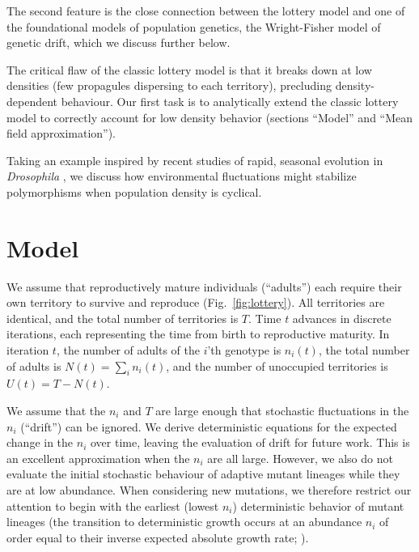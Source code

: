 \documentclass[11pt]{article}
\begin{document}
The second feature is the close connection between the lottery model and one of the foundational models of population genetics, the Wright-Fisher model of genetic drift, which we discuss further below. 

The critical flaw of the classic lottery model is that it breaks down at low densities (few propagules dispersing to each territory), precluding density-dependent behaviour. Our first task is to analytically extend the classic lottery model to correctly account for low density behavior (sections ``Model'' and ``Mean field approximation'').

Taking an example inspired by recent studies of rapid, seasonal evolution in \textit{Drosophila} \citep{bergland_14}, we discuss how environmental fluctuations might stabilize polymorphisms when population density is cyclical. 


 
\section*{Model}\label{sec:model}

We assume that reproductively mature individuals (``adults'') each require their own territory to survive and reproduce (Fig.~\ref{fig:lottery}). All territories are identical, and the total number of territories is $T$. Time $t$ advances in discrete iterations, each representing the time from birth to reproductive maturity. In iteration $t$, the number of adults of the $i$'th genotype is $n_i(t)$, the total number of adults is $N(t)=\sum_i n_i(t)$, and the number of unoccupied territories is $U(t)=T-N(t)$. 

We assume that the $n_i$ and $T$ are large enough that stochastic fluctuations in the $n_i$ (``drift'') can be ignored. We derive deterministic equations for the expected change in the $n_i$ over time, leaving the evaluation of drift for future work. This is an excellent approximation when the $n_i$ are all large. However, we also do not evaluate the initial stochastic behaviour of adaptive mutant lineages while they are at low abundance. When considering new mutations, we therefore restrict our attention to begin with the earliest (lowest $n_i$) deterministic behavior of mutant lineages (the transition to deterministic growth occurs at an abundance $n_i$ of order equal to their inverse expected absolute growth rate; \citealt{uecker_2011}).
\end{document}
